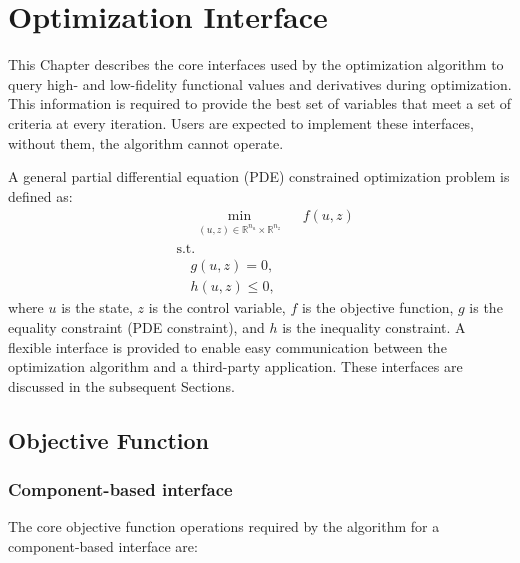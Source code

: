 \chapter{Optimization Interface}

This Chapter describes the core interfaces used by the optimization algorithm to query high- and low-fidelity functional values and derivatives during optimization. This information is required to provide the best set of variables that meet a set of criteria at every iteration. Users are expected to implement these interfaces, without them, the algorithm cannot operate. 

A general partial differential equation (PDE) constrained optimization problem is defined as:
\begin{equation}
\label{eq:definition}
\begin{aligned}
&\quad\min_{\substack{(u,z)\in\mathbb{R}^{n_u}\times\mathbb{R}^{n_z}}}\quad f(u,z) \\
&\text{s.t.} \\
&\quad g(u,z) = 0,\\
&\quad h(u,z) \le 0,
\end{aligned}
\end{equation}
where $u$ is the state, $z$ is the control variable, $f$ is the objective function, $g$ is the equality constraint (PDE constraint), and $h$ is the inequality constraint. A flexible interface is provided to enable easy communication between the optimization algorithm and a third-party application. These interfaces are discussed in the subsequent Sections.

    \section{Objective Function}\label{sec:ObjectiveAPI}
    
    \subsection{Component-based interface}\label{subsec:ObjectiveComponentAPI}
    
    The core objective function operations required by the algorithm for a component-based interface are: 
    
